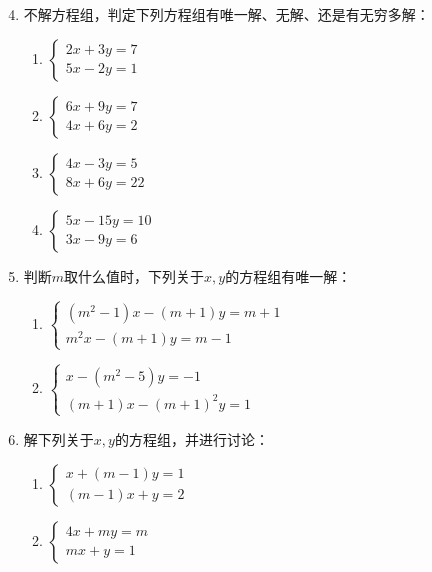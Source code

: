 \begin{enumerate}\setcounter{enumi}{3}
  \item 不解方程组，判定下列方程组有唯一解、无解、还是有无穷多解：
\begin{multicols}{2}
\begin{enumerate}[(1)]
  \item $\begin{cases}
    2x+3y=7\\ 5x-2y=1
  \end{cases}$
  \item $\begin{cases}
    6x+9y=7\\ 4x+6y=2
  \end{cases}$
  \item $\begin{cases}
    4x-3y=5\\ 8x+6y=22
  \end{cases}$
  \item $\begin{cases}
    5x-15y=10\\ 3x-9y=6
  \end{cases}$
\end{enumerate}
\end{multicols}
  \item 判断$m$取什么值时，下列关于$x,y$的方程组有唯一解：
\begin{multicols}{2}
\begin{enumerate}[(1)]
  \item $\begin{cases}
    (m^2-1)x-(m+1)y=m+1\\
    m^2x-(m+1)y=m-1
  \end{cases}$
  \item $\begin{cases}
    x-(m^2-5)y=-1\\
    (m+1)x- (m+1)^2 y=1
  \end{cases}$
\end{enumerate}
\end{multicols}
\item 解下列关于$x,y$的方程组，并进行讨论：
\begin{multicols}{2}
\begin{enumerate}[(1)]
  \item $\begin{cases}
    x+(m-1)y=1\\ (m-1)x+y=2
  \end{cases}$
  \item $\begin{cases}
    4x+my=m\\ mx+y=1
  \end{cases}$
\end{enumerate}
\end{multicols}
\end{enumerate}

